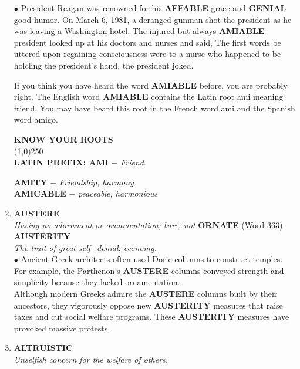 \documentclass{book}
\begin{document}
\begin{enumerate}
$ \bullet $ President Reagan was renowned for his \textbf{AFFABLE}
grace and \textbf{GENIAL} good humor. On March 6, 1981, a
deranged gunman shot the president as he was
leaving a Washington hotel. The injured but always
\textbf{AMIABLE} president looked up at his doctors and
nurses and said,  The
first words be uttered upon regaining consciousness
were to a nurse who happened to be holcling the
president's hand.  the
president joked.

\begin{tcolorbox}
If you think you have heard the word \textbf{AMIABLE} before, you are probably right. The English word
\textbf{AMIABLE} contains the Latin root ami meaning
friend. You may have beard this root in the
French word ami and the Spanish word amigo.
\begin{center}
\textbf{ KNOW YOUR ROOTS}\\
\line(1,0){250}\\
\textbf{LATIN PREFIX: AMI} $-$ \textit{Friend}.\\  
\end{center}  
\textbf{AMITY} $-$ \textit{Friendship, harmony}\\
\textbf{AMICABLE} $-$ \textit{peaceable, harmonious}
\end{tcolorbox}

\item \textbf{AUSTERE}\\
\textit{Having no adornment or ornamentation; bare;
not} \textbf{ORNATE} (Word 363).\\ \textbf{AUSTERITY}\\ \textit{The trait of great self$-$denial; economy.}\\

$ \bullet $ Ancient Greek architects often used Doric columns to construct temples. For example, the Parthenon's \textbf{AUSTERE} columns conveyed strength and simplicity because they lacked ornamentation.\\

Although modern Greeks admire the \textbf{AUSTERE}
columns built by their ancestors, they vigorously
oppose new \textbf{AUSTERITY} measures that raise taxes
and cut social welfare programs. These \textbf{AUSTERITY}
measures have provoked massive protests.

\item \textbf{ALTRUISTIC}\\\textit{Unselfish concern for the welfare of others.}\\


\end{enumerate}
\end{document}
